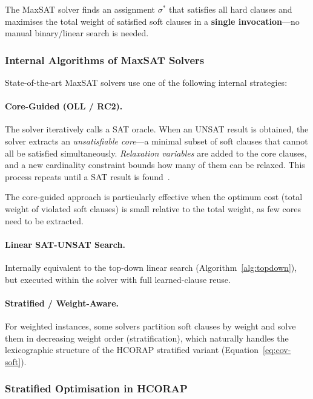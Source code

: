 \documentclass[11pt,a4paper]{article}
\begin{document}
The MaxSAT solver finds an assignment $\sigma^*$ that satisfies all hard
clauses and maximises the total weight of satisfied soft clauses in a
\textbf{single invocation}---no manual binary/linear search is needed.

\subsubsection{Internal Algorithms of MaxSAT Solvers}

State-of-the-art MaxSAT solvers use one of the following internal strategies:

\paragraph{Core-Guided (OLL / RC2).}
The solver iteratively calls a SAT oracle.  When an UNSAT result is obtained,
the solver extracts an \emph{unsatisfiable core}---a minimal subset of soft
clauses that cannot all be satisfied simultaneously.  \emph{Relaxation
variables} are added to the core clauses, and a new cardinality constraint
bounds how many of them can be relaxed.  This process repeats until a SAT
result is found~\cite{rc2maxsat,morgado2013iterative}.

The core-guided approach is particularly effective when the optimum cost (total
weight of violated soft clauses) is small relative to the total weight, as few
cores need to be extracted.

\paragraph{Linear SAT-UNSAT Search.}
Internally equivalent to the top-down linear search
(Algorithm~\ref{alg:topdown}), but executed within the solver with full
learned-clause reuse.

\paragraph{Stratified / Weight-Aware.}
For weighted instances, some solvers partition soft clauses by weight and
solve them in decreasing weight order (stratification), which naturally
handles the lexicographic structure of the HCORAP stratified variant
(Equation~\ref{eq:cov-soft}).

\subsubsection{Stratified Optimisation in HCORAP}
\end{document}
